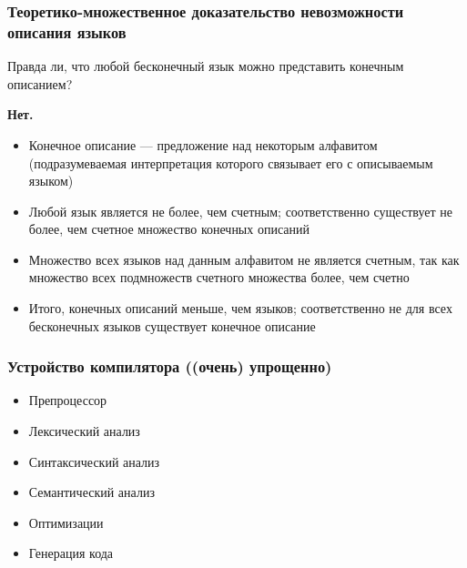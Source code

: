 \documentclass{beamer}
\begin{document}
\begin{frame}[fragile]
  \transwipe[direction=90]
  \frametitle{Теоретико-множественное доказательство невозможности описания языков}

  \begin{center}
    Правда ли, что любой бесконечный язык можно представить конечным описанием?

    \pause \textbf{Нет.}
  \end{center}

  \begin{itemize}
    \item Конечное описание --- предложение над некоторым алфавитом (подразумеваемая интерпретация которого связывает его с описываемым языком) \pause
    \item Любой язык является не более, чем счетным; соответственно существует не более, чем счетное множество конечных описаний \pause
    \item Множество всех языков над данным алфавитом не является счетным, так как множество всех подмножеств счетного множества более, чем счетно \pause
    \item Итого, конечных описаний меньше, чем языков; соответственно не для всех бесконечных языков существует конечное описание
  \end{itemize}
\end{frame}


\begin{frame}[fragile]
  \transwipe[direction=90]
  \frametitle{Устройство компилятора ((очень) упрощенно)}
\begin{itemize}
  \item Препроцессор
  \item Лексический анализ
  \item Синтаксический анализ
  \item Семантический анализ
  \item Оптимизации
  \item Генерация кода
\end{itemize}
\end{frame}
\end{document}

